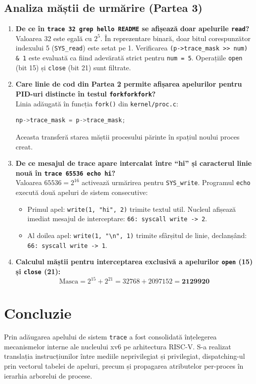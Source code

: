 \documentclass[12pt,a4paper]{article}
\begin{document}
\subsection{Analiza măștii de urmărire (Partea 3)}
\begin{enumerate}
    \item \textbf{De ce în \texttt{trace 32 grep hello README} se afișează doar apelurile \texttt{read}?}\\
    Valoarea $32$ este egală cu $2^5$. În reprezentare binară, doar bitul corespunzător indexului 5 (\texttt{SYS\_read}) este setat pe 1. Verificarea \texttt{(p->trace\_mask >> num) \& 1} este evaluată ca fiind adevărată strict pentru \texttt{num = 5}. Operațiile \texttt{open} (bit 15) și \texttt{close} (bit 21) sunt filtrate.

    \item \textbf{Care linie de cod din Partea 2 permite afișarea apelurilor pentru PID-uri distincte în testul \texttt{forkforkfork}?}\\
    Linia adăugată în funcția \texttt{fork()} din \texttt{kernel/proc.c}:
    \begin{lstlisting}[language=C]
np->trace_mask = p->trace_mask;
    \end{lstlisting}
    Aceasta transferă starea măștii procesului părinte în spațiul noului proces creat.

    \item \textbf{De ce mesajul de trace apare intercalat între ``hi'' și caracterul linie nouă în \texttt{trace 65536 echo hi}?}\\
    Valoarea $65536 = 2^{16}$ activează urmărirea pentru \texttt{SYS\_write}. Programul \texttt{echo} execută două apeluri de sistem consecutive:
    \begin{itemize}
        \item Primul apel: \texttt{write(1, "hi", 2)} trimite textul util. Nucleul afișează imediat mesajul de interceptare: \texttt{66: syscall write -> 2}.
        \item Al doilea apel: \texttt{write(1, "\textbackslash n", 1)} trimite sfârșitul de linie, declanșând: \texttt{66: syscall write -> 1}.
    \end{itemize}

    \item \textbf{Calculul măștii pentru interceptarea exclusivă a apelurilor \texttt{open} (15) și \texttt{close} (21):}\\
    \[
    \text{Masca} = 2^{15} + 2^{21} = 32768 + 2097152 = \mathbf{2129920}
    \]
\end{enumerate}

\section{Concluzie}
Prin adăugarea apelului de sistem \texttt{trace} a fost consolidată înțelegerea mecanismelor interne ale nucleului xv6 pe arhitectura RISC-V. S-a realizat translația instrucțiunilor între mediile neprivilegiat și privilegiat, dispatching-ul prin vectorul tabelei de apeluri, precum și propagarea atributelor per-proces în ierarhia arborelui de procese.
\end{document}
